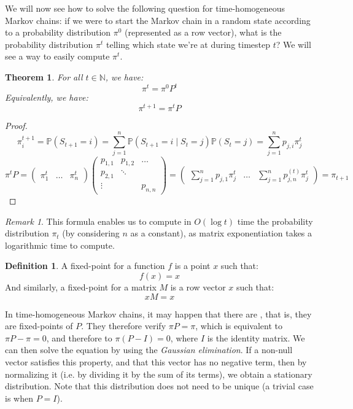 \documentclass{article}
\newtheorem{theorem}{Theorem}[section]
\theoremstyle{definition}
\newtheorem{definition}{Definition}[section]
\theoremstyle{remark}
\newtheorem*{remark}{Remark}
\theoremstyle{example}
\begin{document}
We will now see how to solve the following question for time-homogeneous Markov chains: if we were to start the Markov chain in a random state according to a probability distribution $\pi^0$ (represented as a row vector), what is the probability distribution $\pi^t$ telling which state we're at during timestep $t$? We will see a way to easily compute $\pi^t$.

\begin{theorem}
		For all $t \in \mathbb{N}$, we have:
				$$\pi^t = \pi^0 P^t$$
		Equivalently, we have:
				$$\pi^{t+1} = \pi^t P$$
\end{theorem}

\begin{proof}
		$$\pi^{t+1}_i = \mathbb{P}(S_{t+1} = i) = \sum_{j=1}^n \mathbb{P}(S_{t+1} = i \mid S_t = j) \mathbb{P}(S_t = j) = \sum_{j=1}^n p_{j,i} \pi^t_j$$
		$$\pi^t P = \begin{pmatrix} \pi^t_1 & \dots & \pi^t_n \end{pmatrix} \begin{pmatrix} p_{1,1} & p_{1,2} & \dots \\ p_{2,1} & \ddots & \\ \vdots & & p_{n,n} \end{pmatrix}
		= \begin{pmatrix} \sum_{j=1}^n p_{j,1} \pi^t_j & \dots & \sum_{j=1}^n p_{j,n}^{(t)} \pi^t_j \end{pmatrix}
		= \pi_{t+1}$$
\end{proof}

\begin{remark}
		This formula enables us to compute in $O(\log t)$ time the probability distribution $\pi_t$ (by considering $n$ as a constant), as matrix exponentiation takes a logarithmic time to compute.
\end{remark}

\begin{definition}
		A fixed-point for a function $f$ is a point $x$ such that:
				$$f(x) = x$$
		And similarly, a fixed-point for a matrix $M$ is a row vector $x$ such that:
				$$xM = x$$
\end{definition}

In time-homogeneous Markov chains, it may happen that there are , that is, they are fixed-points of $P$. They therefore verify $\pi P = \pi$, which is equivalent to $\pi P - \pi = 0$, and therefore to $\pi(P - I) = 0$, where $I$ is the identity matrix. We can then solve the equation by using the \textit{Gaussian elimination}. If a non-null vector satisfies this property, and that this vector has no negative term, then by normalizing it (i.e. by dividing it by the sum of its terms), we obtain a stationary distribution. Note that this distribution does not need to be unique (a trivial case is when $P=I$).
\end{document}
